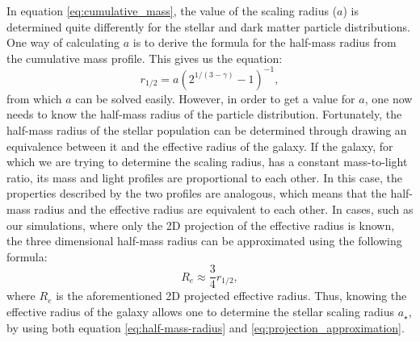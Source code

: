 \documentclass[english, twoside]{HYgradu}
\begin{document}
In equation \ref{eq:cumulative_mass}, the value of the scaling radius ($a$) is determined quite differently for the stellar and dark matter particle distributions. One way of calculating $a$ is to derive the formula for the half-mass radius from the cumulative mass profile. This gives us the equation:
\begin{equation}
r_{1/2} = a \left( 2^{1/(3-\gamma)}-1 \right)^{-1}, \label{eq:half-mass-radius}
\end{equation}
from which $a$ can be solved easily. However, in order to get a value for $a$, one now needs to know the half-mass radius of the particle distribution. Fortunately, the half-mass radius of the stellar population can be determined through drawing an equivalence between it and the effective radius of the galaxy. If the galaxy, for which we are trying to determine the scaling radius, has a constant mass-to-light ratio, its mass and light profiles are proportional to each other. In this case, the properties described by the two profiles are analogous, which means that the half-mass radius and the effective radius are equivalent to each other. In cases, such as our simulations, where only the 2D projection of the effective radius is known, the three dimensional half-mass radius can be approximated using the following formula:
\begin{equation}
R_e \approx \frac{3}{4} r_{1/2}, \label{eq:projection_approximation}
\end{equation} 
where $R_e$ is the aforementioned 2D projected effective radius. Thus, knowing the effective radius of the galaxy allows one to determine the stellar scaling radius $a_\star$, by using both equation \ref{eq:half-mass-radius} and \ref{eq:projection_approximation}.
\end{document}
